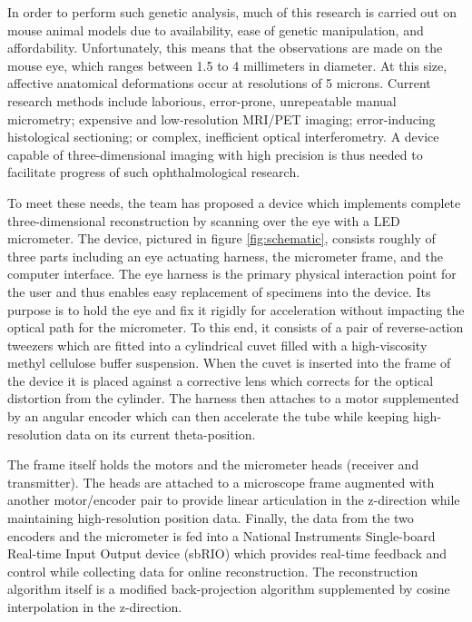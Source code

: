 \documentclass{article}
\begin{document}
In order to perform such genetic analysis, much of this research is
carried out on mouse animal models due to availability, ease of
genetic manipulation, and
affordability\cite{schaeffel04}. Unfortunately, this means that the
observations are made on the mouse eye, which ranges between 1.5 to 4
millimeters in diameter. At this size, affective anatomical
deformations occur at resolutions of 5 microns. Current research
methods include laborious, error-prone, unrepeatable manual
micrometry\cite{wallman04}; expensive and low-resolution MRI/PET
imaging\cite{atchison04}; error-inducing histological
sectioning\cite{schaeffel04}; or complex, inefficient optical
interferometry\cite{guggenheim04,schaeffel04}. A device capable of
three-dimensional imaging with high precision is thus needed to
facilitate progress of such ophthalmological research.

To meet these needs, the team has proposed a device which implements
complete three-dimensional reconstruction by scanning over the eye
with a LED micrometer. The device, pictured in figure
\ref{fig:schematic}, consists roughly of three parts including an eye
actuating harness, the micrometer frame, and the computer
interface. The eye harness is the primary physical interaction point
for the user and thus enables easy replacement of specimens into the
device. Its purpose is to hold the eye and fix it rigidly for
acceleration without impacting the optical path for the micrometer. To
this end, it consists of a pair of reverse-action tweezers which are
fitted into a cylindrical cuvet filled with a high-viscosity methyl
cellulose buffer suspension. When the cuvet is inserted into the frame
of the device it is placed against a corrective lens which corrects
for the optical distortion from the cylinder. The harness then
attaches to a motor supplemented by an angular encoder which can then
accelerate the tube while keeping high-resolution data on its current
theta-position.

The frame itself holds the motors and the micrometer heads (receiver
and transmitter). The heads are attached to a microscope frame
augmented with another motor/encoder pair to provide linear
articulation in the z-direction while maintaining high-resolution
position data. Finally, the data from the two encoders and the
micrometer is fed into a National Instruments Single-board Real-time
Input Output device (sbRIO) which provides real-time feedback and
control while collecting data for online reconstruction. The
reconstruction algorithm itself is a modified back-projection
algorithm supplemented by cosine interpolation in the z-direction.
\end{document}
